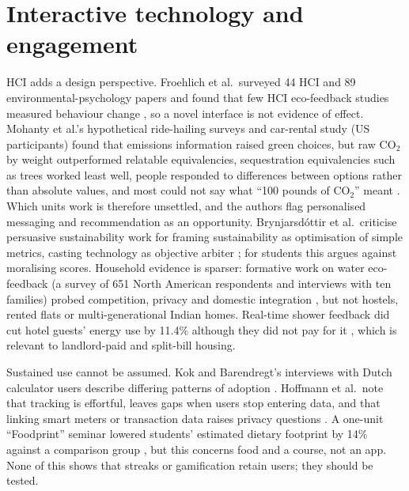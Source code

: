 \documentclass[10pt,a4paper,twocolumn]{article}
\begin{document}
\section{Interactive technology and engagement}
HCI adds a design perspective. Froehlich et al.\ surveyed 44 HCI and 89 environmental-psychology papers and found that few HCI eco-feedback studies measured behaviour change \cite{froehlich2010}, so a novel interface is not evidence of effect. Mohanty et al.'s hypothetical ride-hailing surveys and car-rental study (US participants) found that emissions information raised green choices, but raw CO$_2$ by weight outperformed relatable equivalencies, sequestration equivalencies such as trees worked least well, people responded to differences between options rather than absolute values, and most could not say what ``100 pounds of CO$_2$'' meant \cite{mohanty2023}. Which units work is therefore unsettled, and the authors flag personalised messaging and recommendation as an opportunity. Brynjarsd\'ottir et al.\ criticise persuasive sustainability work for framing sustainability as optimisation of simple metrics, casting technology as objective arbiter \cite{brynjarsdottir2012}; for students this argues against moralising scores. Household evidence is sparser: formative work on water eco-feedback (a survey of 651 North American respondents and interviews with ten families) probed competition, privacy and domestic integration \cite{froehlich2012}, but not hostels, rented flats or multi-generational Indian homes. Real-time shower feedback did cut hotel guests' energy use by 11.4\% although they did not pay for it \cite{tiefenbeck2019}, which is relevant to landlord-paid and split-bill housing.

Sustained use cannot be assumed. Kok and Barendregt's interviews with Dutch calculator users describe differing patterns of adoption \cite{kok2021}. Hoffmann et al.\ note that tracking is effortful, leaves gaps when users stop entering data, and that linking smart meters or transaction data raises privacy questions \cite{hoffmann2024}. A one-unit ``Foodprint'' seminar lowered students' estimated dietary footprint by 14\% against a comparison group \cite{malan2020}, but this concerns food and a course, not an app. None of this shows that streaks or gamification retain users; they should be tested.
\end{document}
